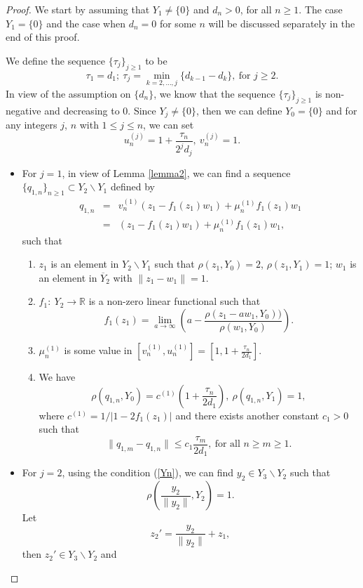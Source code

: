 \documentclass[12pt, reqno]{amsart}
\theoremstyle{definition}
\theoremstyle{remark}
\numberwithin{equation}{section}
\begin{document}
\begin{proof} We start by assuming that $Y_1 \neq \{0\}$ and  $d_n>0$, for all $n\ge1$. The case $Y_1=\{0\}$ and the case when $d_n=0$ for some $n$ will be discussed separately in the end of this proof.

We define the sequence $\{\tau_j\}_{j\ge1}$ to be
$$
\tau_1=d_1;~\tau_{j}=\min\limits_{k=2,\ldots,j}\{d_{k-1}-d_{k}\},~\mbox{for $j\ge2$}.
$$
In view of the assumption on $\{d_n\}$, we know that the sequence $\{\tau_{j}\}_{j\ge1}$ is non-negative and decreasing to $0$. Since $Y_j\ne \{0\}$, then we can define $Y_0=\{0\}$ and for any integers $j$, $n$ with $1\le j\le n$, we can set
$$
u_n^{(j)}=1+\frac{\tau_n}{2^jd_j},~v_n^{(j)}=1.
$$
\begin{itemize}
\item For $j=1$, in view of Lemma \ref{lemma2}, we can find a sequence $\{q_{1,n}\}_{n\ge 1}\subset Y_{2}\backslash Y_1$ defined by
\begin{eqnarray*}
q_{1,n}&=&v_n^{(1)}(z_1-f_1(z_1)w_1)+\mu_n^{(1)}f_1(z_1)w_1\\
&=&(z_1-f_1(z_1)w_1)+\mu_n^{(1)}f_1(z_1)w_1,
\end{eqnarray*}
such that
\renewcommand{\labelenumi}{\alph{enumi})}
\begin{enumerate}
\item[(i)] $z_1$ is an element in $Y_2\backslash Y_1$ such that $\rho(z_1,Y_0)=2$, $\rho(z_1,Y_1)=1$; $w_1$ is an element in $\overline Y_2$ with $\|z_1-w_1\|=1$.
    \item[(ii)] $f_1:~Y_2\rightarrow \mathbb R$ is a non-zero linear functional such that 
    $$
    f_1(z_1)=\lim\limits_{a\to\infty}\left(a-\frac{\rho(z_1-aw_1,Y_0))}{\rho(w_1,Y_0)}\right).
    $$
    \item[(iii)] $\mu_n^{(1)}$ is some value in $[v_n^{(1)},u_n^{(1)}]=\left[1,1+\frac{\tau_n}{2d_1}\right]$.
    \item[(iv)] We have 
$$
\rho(q_{1,n},Y_{0})=c^{(1)}\left(1+\frac{\tau_n}{2d_1}\right),~\rho(q_{1,n},Y_1)=1,
$$
where $c^{(1)}=1/|1-2f_1(z_1)|$ 
and there exists another constant $c_1>0$ such that
$$
\|q_{1,m}-q_{1,n}\|\le c_1\frac{\tau_m}{2d_1},~\mbox{for all $n\ge m\ge 1$}.
$$
\end{enumerate}
\item For $j=2$, using the condition (\ref{Yn}), we can find $y_2\in Y_3\backslash Y_2$ such that
$$
\rho\left(\frac{y_2}{\|y_2\|},Y_2\right)=1.
$$
Let 
$$
z_2'=\frac{y_2}{\|y_2\|}+z_1,
$$
then $z_2'\in Y_3\backslash Y_2$ and
\begin{equation}

\end{equation}
\end{itemize}
\end{proof}
\end{document}
